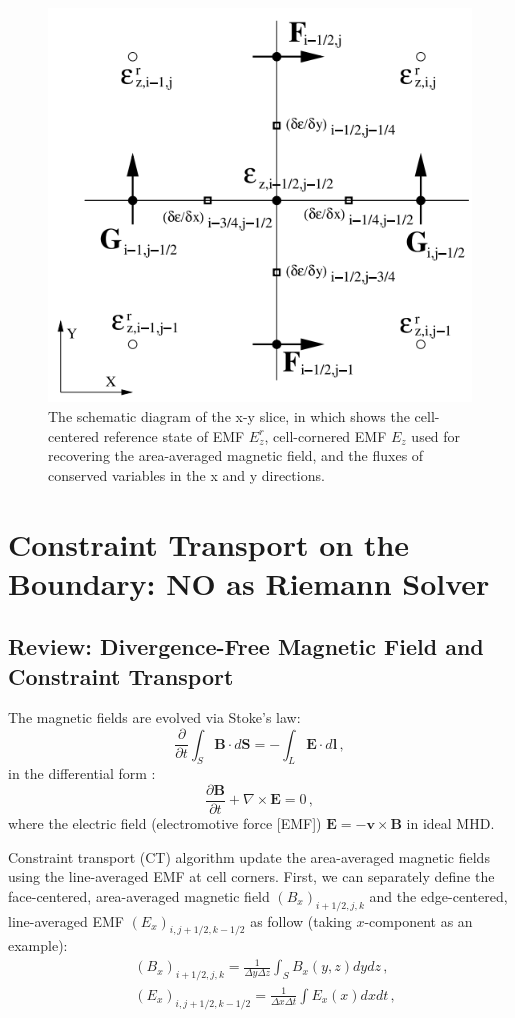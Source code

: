 \documentclass{article}
\newcommand{\hywcom}[1]{{\color{purple}{[HYW: #1]}}}
\begin{document}
\begin{figure}
    \centering
    \includegraphics[width=0.4\linewidth]{figures/ct-2.png}
    \caption{
    \hywcom{Adopting from Athena method paper-remake later}
    The schematic diagram of the x-y slice, in which shows the cell-centered reference state of EMF $E^r_z$, cell-cornered EMF $E_z$ used for recovering the area-averaged magnetic field, and the fluxes of conserved variables in the x and y directions.
    } 
    \label{fig:ct-2}
\end{figure}

\section{Constraint Transport on the Boundary: NO as Riemann Solver }

\subsection{Review: Divergence-Free Magnetic Field and Constraint Transport}
The magnetic fields are evolved via Stoke's law:
\begin{equation}
\frac{\partial}{\partial t} \int_S \boldsymbol{B} \cdot d \boldsymbol{S}=-\int_L \boldsymbol{E} \cdot d \boldsymbol{l} \,,
\end{equation}
in the differential form : 
\begin{equation}
\frac{\partial \boldsymbol{B}}{\partial t}+\nabla \times \boldsymbol{E} =0 \,,
\end{equation}
where the electric field (electromotive force [EMF]) $\boldsymbol{E}=-\boldsymbol{v}\times \boldsymbol{B}$ in ideal MHD. 


Constraint transport (CT) algorithm update the area-averaged magnetic fields using the line-averaged EMF at cell corners. First, we can separately define the face-centered, area-averaged magnetic field $\left(B_x\right)_{i+1 / 2, j, k}$ and the edge-centered, line-averaged EMF $\left(E_x\right)_{i, j+1 / 2, k-1 / 2}$ as follow (taking $x$-component as an example): 
\begin{align}
&\left(B_x\right)_{i+1 / 2, j, k} =\frac{1}{\Delta y \Delta z} \int_S B_x(y, z) d y d z\, , \\
&\left(E_x\right)_{i, j+1 / 2, k-1 / 2} =\frac{1}{\Delta x \Delta t} \int E_x(x) d x d t\, ,
\end{align}
\end{document}
